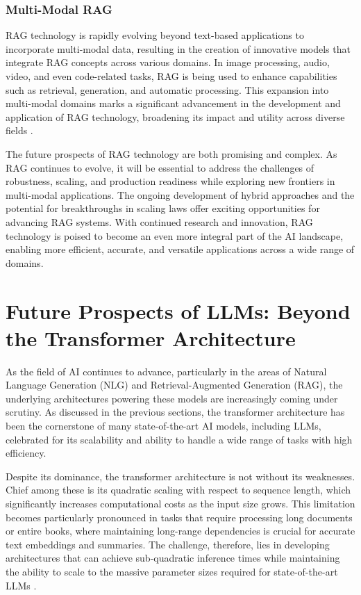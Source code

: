 \subsubsection{Multi-Modal RAG}

RAG technology is rapidly evolving beyond text-based applications to incorporate multi-modal data, resulting in the creation of innovative models that integrate RAG concepts across various domains. In image processing, audio, video, and even code-related tasks, RAG is being used to enhance capabilities such as retrieval, generation, and automatic processing. This expansion into multi-modal domains marks a significant advancement in the development and application of RAG technology, broadening its impact and utility across diverse fields \cite{gao2023retrieval}.

The future prospects of RAG technology are both promising and complex. As RAG continues to evolve, it will be essential to address the challenges of robustness, scaling, and production readiness while exploring new frontiers in multi-modal applications. The ongoing development of hybrid approaches and the potential for breakthroughs in scaling laws offer exciting opportunities for advancing RAG systems. With continued research and innovation, RAG technology is poised to become an even more integral part of the AI landscape, enabling more efficient, accurate, and versatile applications across a wide range of domains.

\section{Future Prospects of LLMs: Beyond the Transformer Architecture}

As the field of AI continues to advance, particularly in the areas of Natural Language Generation (NLG) and Retrieval-Augmented Generation (RAG), the underlying architectures powering these models are increasingly coming under scrutiny. As discussed in the previous sections, the transformer architecture has been the cornerstone of many state-of-the-art AI models, including LLMs, celebrated for its scalability and ability to handle a wide range of tasks with high efficiency.

Despite its dominance, the transformer architecture is not without its weaknesses. Chief among these is its quadratic scaling with respect to sequence length, which significantly increases computational costs as the input size grows. This limitation becomes particularly pronounced in tasks that require processing long documents or entire books, where maintaining long-range dependencies is crucial for accurate text embeddings and summaries. The challenge, therefore, lies in developing architectures that can achieve sub-quadratic inference times while maintaining the ability to scale to the massive parameter sizes required for state-of-the-art LLMs \cite{paull2023transformer}.

